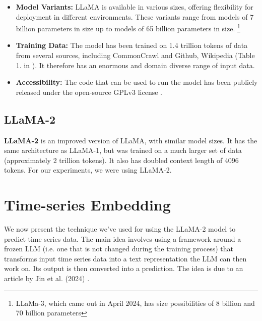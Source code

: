 \begin{itemize}
	\item \textbf{Model Variants:} LLaMA is available in various sizes, offering flexibility for deployment in different environments. These variants range from models of 7 billion parameters in size up to models of 65 billion parameters in size. \footnote{LLaMa-3, which came out in April 2024, has size possibilities of 8 billion and 70 billion parameters}

	\item \textbf{Training Data:} The model has been trained on 1.4 trillion tokens of data from several sources, including CommonCrawl and Github, Wikipedia (Table 1. in \cite{llama}). It therefore has an enormous and domain diverse range of input data.


	\item \textbf{Accessibility:} The code that can be used to run the model has been publicly released under the open-source GPLv3 license \cite{llama_code}.
\end{itemize}

\subsection{LLaMA-2}
\textbf{LLaMA-2} \cite{llama2} is an improved version of LLaMA, with similar model sizes. It has the same architecture as LLaMA-1, but was trained on a much larger set of data (approximately 2 trillion tokens). It also has doubled context length of 4096 tokens. For our experiments, we were using LLaMA-2.

\section{Time-series Embedding}
We now present the technique we've used for using the LLaMA-2 model to predict time series data.
The main idea involves using a framework around a frozen LLM (i.e. one that is not changed during the training process) that transforms input time series data into a text representation the LLM can then work on. Its output is then converted into a prediction. The idea is due to an article by Jin et al. (2024) \cite{reprogramming_llm}.

